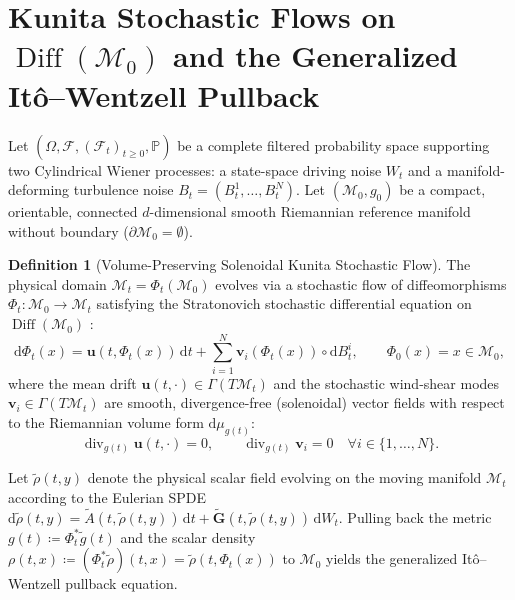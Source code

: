 \documentclass[11pt,a4paper,reqno]{article}
\theoremstyle{plain}
\theoremstyle{definition}
\newtheorem{definition}[theorem]{Definition}
\theoremstyle{remark}
\numberwithin{equation}{section}
\begin{document}
\section{Kunita Stochastic Flows on \texorpdfstring{$\operatorname{Diff}(\mathcal{M}_0)$}{Diff(M0)} and the Generalized It\^o--Wentzell Pullback}
\label{sec:kunita_pullback}

Let $(\Omega, \mathcal{F}, (\mathcal{F}_t)_{t \ge 0}, \mathbb{P})$ be a complete filtered probability space supporting two Cylindrical Wiener processes: a state-space driving noise $W_t$ and a manifold-deforming turbulence noise $B_t = (B_t^1, \dots, B_t^N)$. Let $(\mathcal{M}_0, g_0)$ be a compact, orientable, connected $d$-dimensional smooth Riemannian reference manifold without boundary ($\partial\mathcal{M}_0 = \emptyset$).

\begin{definition}[Volume-Preserving Solenoidal Kunita Stochastic Flow]
The physical domain $\mathcal{M}_t = \Phi_t(\mathcal{M}_0)$ evolves via a stochastic flow of diffeomorphisms $\Phi_t : \mathcal{M}_0 \to \mathcal{M}_t$ satisfying the Stratonovich stochastic differential equation on $\operatorname{Diff}(\mathcal{M}_0)$ \cite{kunita1990stochastic, baxendale1984brownian}:
\begin{equation}\label{eq:kunita_flow}
  \mathrm{d}\Phi_t(x) = \mathbf{u}(t, \Phi_t(x))\,\mathrm{d}t + \sum_{i=1}^N \mathbf{v}_i(\Phi_t(x)) \circ \mathrm{d}B_t^i, \qquad \Phi_0(x) = x \in \mathcal{M}_0,
\end{equation}
where the mean drift $\mathbf{u}(t,\cdot) \in \Gamma(T\mathcal{M}_t)$ and the stochastic wind-shear modes $\mathbf{v}_i \in \Gamma(T\mathcal{M}_t)$ are smooth, divergence-free (solenoidal) vector fields with respect to the Riemannian volume form $\mathrm{d}\mu_{g(t)}$:
\begin{equation}\label{eq:solenoidal_cond}
  \operatorname{div}_{g(t)} \mathbf{u}(t, \cdot) = 0, \qquad \operatorname{div}_{g(t)} \mathbf{v}_i = 0 \quad \forall i \in \{1, \dots, N\}.
\end{equation}
\end{definition}

Let $\tilde{\rho}(t, y)$ denote the physical scalar field evolving on the moving manifold $\mathcal{M}_t$ according to the Eulerian SPDE $\mathrm{d}\tilde{\rho}(t,y) = \tilde{A}(t,\tilde{\rho}(t,y))\,\mathrm{d}t + \tilde{\mathbf{G}}(t,\tilde{\rho}(t,y))\,\mathrm{d}W_t$. Pulling back the metric $g(t) \coloneqq \Phi_t^* \tilde{g}(t)$ and the scalar density $\rho(t, x) \coloneqq (\Phi_t^* \tilde{\rho})(t, x) = \tilde{\rho}(t, \Phi_t(x))$ to $\mathcal{M}_0$ yields the generalized It\^o--Wentzell pullback equation.
\end{document}
